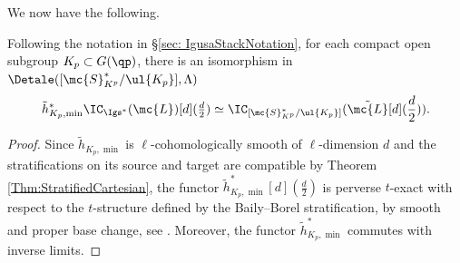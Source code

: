 \documentclass[letterpaper,11pt]{amsart}
\begin{document}
We now have the following.
\begin{proposition}\label{prop: PullbackofIC}
    Following the notation in \S\ref{sec: IgusaStackNotation}, for each compact open subgroup $K_p\subset G(\qp)$, there is an isomorphism in $\Detale([\mc{S}_{K^p}^\ast/\ul{K_p}],\Lambda)$
    \[ \tilde{h}_{K_p,\min}^{\ast}\IC_{\Igs^\ast}(\mc{L})[d](\tfrac{d}{2}) \simeq \IC_{[\mc{S}^\ast_{K^p}/\ul{K_p}]}(\tilde{\mc{L}}[d](\frac{d}{2})).\]
\end{proposition}
\begin{proof}
    Since $\tilde{h}_{K_p,\min}$ is $\ell$-cohomologically smooth of $\ell$-dimension $d$ and the stratifications on its source and target are compatible by Theorem \ref{Thm:StratifiedCartesian}, the functor $\tilde{h}_{K_p,\min}^\ast[d](\tfrac{d}{2})$ is perverse $t$-exact with respect to the $t$-structure defined by the Baily--Borel stratification, by smooth and proper base change, see \cite[Proposition 22.19, Proposition 23.16(i)]{Ecod}. Moreover, the functor $\tilde{h}_{K_{p},\min}^{*}$ commutes with inverse limits.
\end{proof}
\end{document}
